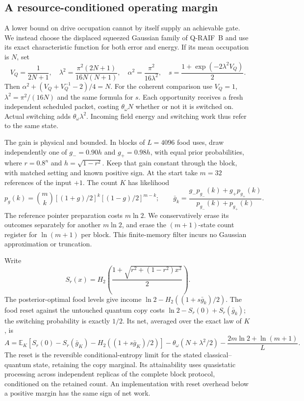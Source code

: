 \documentclass[12pt]{article}
\theoremstyle{definition}
\newcommand{\E}{\mathbb E}
\begin{document}
\subsection{A resource-conditioned operating margin}
\label{subsec:J_viability}

A lower bound on drive occupation cannot by itself supply an achievable gate. We instead choose the displaced squeezed Gaussian family of Q-RAIF~B and use its exact characteristic function for both error and energy. If its mean occupation is $N$, set
\[
V_Q=\frac1{2N+1},\quad
\lambda^2=\frac{\pi^2(2N+1)}{16N(N+1)},\quad
\alpha^2=\frac{\pi^2}{16\lambda^2},\quad
s=\frac{1+\exp(-2\lambda^2V_Q)}2.
\]
Then $\alpha^2+(V_Q+V_Q^{-1}-2)/4=N$. For the coherent comparison use $V_Q=1$, $\lambda^2=\pi^2/(16N)$ and the same formula for $s$. Each opportunity receives a fresh independent scheduled packet, costing $\theta_\omega N$ whether or not it is switched on. Actual switching adds $\theta_\omega\lambda^2$. Incoming field energy and switching work thus refer to the same state.

The gain is physical and bounded. In blocks of $L=4096$ food uses, draw independently one of $g_-=0.90h$ and $g_+=0.98h$, with equal prior probabilities, where $r=0.8^n$ and $h=\sqrt{1-r^2}$. Keep that gain constant through the block, with matched setting and known positive sign. At the start take $m=32$ references of the input $+1$. The count $K$ has likelihood
\[
p_g(k)=\binom mk[(1+g)/2]^k[(1-g)/2]^{m-k};
\qquad
\bar g_k=\frac{g_-p_{g_-}(k)+g_+p_{g_+}(k)}{p_{g_-}(k)+p_{g_+}(k)}.
\]
The reference pointer preparation costs $m\ln2$. We conservatively erase its outcomes separately for another $m\ln2$, and erase the $(m+1)$-state count register for $\ln(m+1)$ per block. This finite-memory filter incurs no Gaussian approximation or truncation.

Write
\[
S_r(x)=H_2\!\left(\frac{1+\sqrt{r^2+(1-r^2)x^2}}2\right).
\]
The posterior-optimal food levels give income $\ln2-H_2((1+s\bar g_k)/2)$. The food reset against the untouched quantum copy costs
$\ln2-S_r(0)+S_r(\bar g_k)$; the switching probability is exactly $1/2$. Its net, averaged over the exact law of $K$, is
\[
A=\E_K\!\left[S_r(0)-S_r(\bar g_K)-H_2((1+s\bar g_K)/2)\right]
-\theta_\omega(N+\lambda^2/2)-\frac{2m\ln2+\ln(m+1)}L.
\]
The reset is the reversible conditional-entropy limit for the stated classical--quantum state, retaining the copy marginal. Its attainability uses quasistatic processing across independent replicas of the complete block protocol, conditioned on the retained count. An implementation with reset overhead below a positive margin has the same sign of net work.
\end{document}
